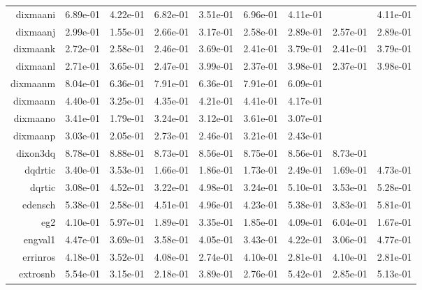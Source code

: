 \begin{tabular}{rrrrrrrrr}
  dixmaani &  6.89e-01 &  4.22e-01 &  6.82e-01 &  3.51e-01 &  6.96e-01 &  4.11e-01 & \cellcolor{black}{\color{white}{ 6.29e-01}} &  4.11e-01 \\
  dixmaanj &  2.99e-01 &  1.55e-01 &  2.66e-01 &  3.17e-01 &  2.58e-01 &  2.89e-01 &  2.57e-01 &  2.89e-01 \\
  dixmaank &  2.72e-01 &  2.58e-01 &  2.46e-01 &  3.69e-01 &  2.41e-01 &  3.79e-01 &  2.41e-01 &  3.79e-01 \\
  dixmaanl &  2.71e-01 &  3.65e-01 &  2.47e-01 &  3.99e-01 &  2.37e-01 &  3.98e-01 &  2.37e-01 &  3.98e-01 \\
  dixmaanm &  8.04e-01 &  6.36e-01 &  7.91e-01 &  6.36e-01 &  7.91e-01 &  6.09e-01 & \cellcolor{black}{\color{white}{ 5.60e-01}} & \cellcolor{black}{\color{white}{ 5.06e-01}} \\
  dixmaann &  4.40e-01 &  3.25e-01 &  4.35e-01 &  4.21e-01 &  4.41e-01 &  4.17e-01 & \cellcolor{black}{\color{white}{ 4.63e-01}} & \cellcolor{black}{\color{white}{ 3.57e-01}} \\
  dixmaano &  3.41e-01 &  1.79e-01 &  3.24e-01 &  3.12e-01 &  3.61e-01 &  3.07e-01 & \cellcolor{black}{\color{white}{ 4.49e-01}} & \cellcolor{black}{\color{white}{ 3.47e-01}} \\
  dixmaanp &  3.03e-01 &  2.05e-01 &  2.73e-01 &  2.46e-01 &  3.21e-01 &  2.43e-01 & \cellcolor{black}{\color{white}{ 4.30e-01}} & \cellcolor{black}{\color{white}{ 3.16e-01}} \\
  dixon3dq &  8.78e-01 &  8.88e-01 &  8.73e-01 &  8.56e-01 &  8.75e-01 &  8.56e-01 &  8.73e-01 & \cellcolor{black}{\color{white}{ 8.58e-01}} \\
  dqdrtic &  3.40e-01 &  3.53e-01 &  1.66e-01 &  1.86e-01 &  1.73e-01 &  2.49e-01 &  1.69e-01 &  4.73e-01 \\
  dqrtic &  3.08e-01 &  4.52e-01 &  3.22e-01 &  4.98e-01 &  3.24e-01 &  5.10e-01 &  3.53e-01 &  5.28e-01 \\
  edensch &  5.38e-01 &  2.58e-01 &  4.51e-01 &  4.96e-01 &  4.23e-01 &  5.38e-01 &  3.83e-01 &  5.81e-01 \\
  eg2 &  4.10e-01 &  5.97e-01 &  1.89e-01 &  3.35e-01 &  1.85e-01 &  4.09e-01 &  6.04e-01 &  1.67e-01 \\
  engval1 &  4.47e-01 &  3.69e-01 &  3.58e-01 &  4.05e-01 &  3.43e-01 &  4.22e-01 &  3.06e-01 &  4.77e-01 \\
  errinros &  4.18e-01 &  3.52e-01 &  4.08e-01 &  2.74e-01 &  4.10e-01 &  2.81e-01 &  4.10e-01 &  2.81e-01 \\
  extrosnb &  5.54e-01 &  3.15e-01 &  2.18e-01 &  3.89e-01 &  2.76e-01 &  5.42e-01 &  2.85e-01 &  5.13e-01 \\

\end{tabular}
